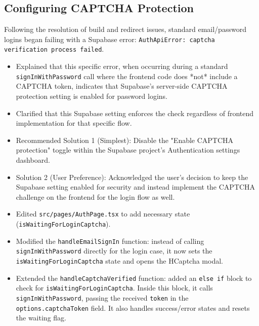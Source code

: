 \documentclass[11pt]{article} %
\begin{document}
\subsection{Configuring CAPTCHA Protection}
\begin{description}[style=unboxed,leftmargin=0pt]
    \item[Problem:] Following the resolution of build and redirect issues, standard email/password logins began failing with a Supabase error: \texttt{AuthApiError: captcha verification process failed}.
    \item[AI Assistance (Diagnosis):]
        \begin{itemize}
            \item Explained that this specific error, when occurring during a standard \texttt{signInWithPassword} call where the frontend code does *not* include a CAPTCHA token, indicates that Supabase's server-side CAPTCHA protection setting is enabled for password logins.
            \item Clarified that this Supabase setting enforces the check regardless of frontend implementation for that specific flow.
        \end{itemize}
    \item[AI Assistance (Solution Options):]
         \begin{itemize}
             \item Recommended Solution 1 (Simplest): Disable the "Enable CAPTCHA protection" toggle within the Supabase project's Authentication settings dashboard.
             \item Solution 2 (User Preference): Acknowledged the user's decision to keep the Supabase setting enabled for security and instead implement the CAPTCHA challenge on the frontend for the login flow as well.
         \end{itemize}
    \item[AI Assistance (Implementation for Login CAPTCHA):]
         \begin{itemize}
             \item Edited \texttt{src/pages/AuthPage.tsx} to add necessary state (\texttt{isWaitingForLoginCaptcha}).
             \item Modified the \texttt{handleEmailSignIn} function: instead of calling \texttt{signInWithPassword} directly for the login case, it now sets the \texttt{isWaitingForLoginCaptcha} state and opens the HCaptcha modal.
             \item Extended the \texttt{handleCaptchaVerified} function: added an \texttt{else if} block to check for \texttt{isWaitingForLoginCaptcha}. Inside this block, it calls \texttt{signInWithPassword}, passing the received \texttt{token} in the \texttt{options.captchaToken} field. It also handles success/error states and resets the waiting flag.

\end{itemize}
\end{description}
\end{document}
